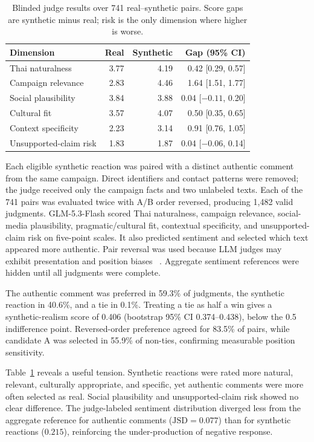 \documentclass[conference]{IEEEtran}
\begin{document}
\begin{table}[!t]
\caption{Blinded judge results over 741 real--synthetic pairs. Score gaps are
synthetic minus real; risk is the only dimension where higher is worse.}
\label{tab:judge-results}
\centering
\footnotesize
\begin{tabular}{@{\extracolsep{8mm}}lrrr@{}}
\toprule
Dimension & Real & Synthetic & Gap (95\% CI) \\
\midrule
Thai naturalness & 3.77 & 4.19 & 0.42 [0.29, 0.57] \\
Campaign relevance & 2.83 & 4.46 & 1.64 [1.51, 1.77] \\
Social plausibility & 3.84 & 3.88 & 0.04 [$-0.11$, 0.20] \\
Cultural fit & 3.57 & 4.07 & 0.50 [0.35, 0.65] \\
Context specificity & 2.23 & 3.14 & 0.91 [0.76, 1.05] \\
Unsupported-claim risk & 1.83 & 1.87 & 0.04 [$-0.06$, 0.14] \\
\bottomrule
\end{tabular}
\end{table}

Each eligible synthetic reaction was paired with a distinct authentic comment
from the same campaign. Direct identifiers and contact patterns were removed;
the judge received only the campaign facts and two unlabeled texts. Each of
the 741 pairs was evaluated twice with A/B order reversed, producing 1,482
valid judgments. GLM-5.3-Flash scored Thai naturalness, campaign relevance,
social-media plausibility, pragmatic/cultural fit, contextual specificity, and
unsupported-claim risk on five-point scales. It also predicted sentiment and
selected which text appeared more authentic. Pair reversal was used because
LLM judges may exhibit presentation and position biases
~\cite{shi2024judging}. Aggregate sentiment references were hidden until all
judgments were complete.

The authentic comment was preferred in 59.3\% of judgments, the synthetic
reaction in 40.6\%, and a tie in 0.1\%. Treating a tie as half a win gives a
synthetic-realism score of 0.406 (bootstrap 95\% CI 0.374--0.438), below the
0.5 indifference point. Reversed-order preference agreed for 83.5\% of pairs,
while candidate A was selected in 55.9\% of non-ties, confirming measurable
position sensitivity.

Table~\ref{tab:judge-results} reveals a useful tension. Synthetic reactions
were rated more natural, relevant, culturally appropriate, and specific, yet
authentic comments were more often selected as real. Social plausibility and
unsupported-claim risk showed no clear difference. The judge-labeled sentiment
distribution diverged less from the aggregate reference for authentic comments
($\mathrm{JSD}=0.077$) than for synthetic reactions ($0.215$), reinforcing the
under-production of negative response.
\end{document}

